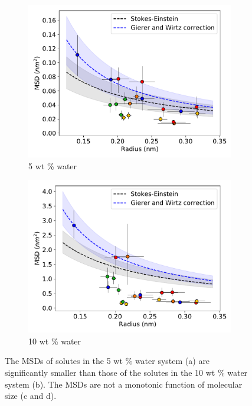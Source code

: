 \documentclass{article}
\begin{document}
\begin{figure}
\begin{subfigure}{0.45\textwidth}
  \includegraphics[width=\textwidth]{msd_radius_5wt.pdf} 
  \caption{5 wt \% water}\label{fig:msd_radius_5wt}
  \end{subfigure}
  \begin{subfigure}{0.45\textwidth}
  \includegraphics[width=\textwidth]{msd_radius_10wt.pdf} 
  \caption{10 wt \% water}\label{fig:msd_radius_10wt}
  \end{subfigure}
  \caption{The MSDs of solutes in the 5 wt \% water system (a) are significantly
  smaller than those of the solutes in the 10 wt \% water system (b). The
  MSDs are not a monotonic function of molecular size (c and d).}\label{fig:msds}
  \end{figure}  
  
\end{document}
